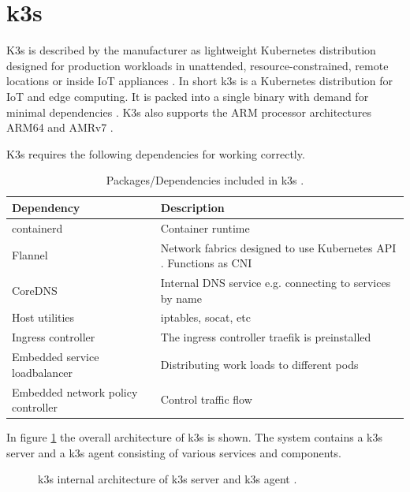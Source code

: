 \section{k3s}
K3s is described by the manufacturer as lightweight Kubernetes distribution designed for production workloads in unattended, resource-constrained, remote locations or inside IoT appliances \cite{k3s}. In short k3s is a Kubernetes distribution for IoT and edge computing. It is packed into a single binary with demand for minimal dependencies \cite{Thoughtworks2020}. K3s also supports the ARM processor architectures ARM64 and AMRv7 \cite{k3s}.

K3s requires the following dependencies for working correctly.

\begin{table}[H]
    \begin{tabularx}{\textwidth}{|X|X|} \hline
        \rowcolor{inovexBlue} 
        {\color[HTML]{FFFFFF} Dependency} & {\color[HTML]{FFFFFF} Description} \\ \hline
        containerd & Container runtime \\ \hline
        Flannel & Network fabrics designed to use Kubernetes API \cite{Flannelcontributors2021}. Functions as \acrfull{CNI} \\ \hline
        CoreDNS & Internal DNS service e.g. connecting to services by name \cite{TheCoreDNSAuthors2021} \\ \hline
        Host utilities & iptables, socat, etc \\ \hline
        Ingress controller & The ingress controller traefik is preinstalled \cite{TraefikLabs} \\ \hline
        Embedded service loadbalancer & Distributing work loads to different pods  \\ \hline
        Embedded network policy controller & Control traffic flow \\ \hline
    \end{tabularx}
    \caption{Packages/Dependencies included in k3s \cite{RancherDocs2020}.}
    \label{tab:pakc-dep-included-in-k3s}
\end{table}

In figure \ref{fig:how-it-works-k3s} the overall architecture of k3s is shown. The system contains a k3s server and a k3s agent consisting of various services and components.

\begin{figure}[H]
  \centering
  
  \caption{k3s internal architecture of k3s server and k3s agent \cite{k3s}.}
  \label{fig:how-it-works-k3s}
\end{figure}

